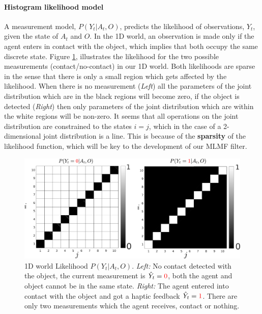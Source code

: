 \paragraph{Histogram likelihood model}

A measurement model, $P(Y_t|A_t,O)$, predicts the likelihood of observations, $Y_t$, given the state of $A_t$ and $O$. 
In the 1D world, an observation is made only if the agent enters in contact with the object, which implies that both
occupy the same discrete state. Figure \ref{fig:histogram_likelihood}, illustrates the likelihood for the two possible 
measurements (contact/no-contact) in our 1D world. Both likelihoods are sparse in the sense that there is only a small 
region which gets affected by the likelihood. When there is no measurement (\textit{Left}) all the parameters of the 
joint distribution which are in the black regions will become zero, if the object is detected (\textit{Right}) then 
only parameters of the joint distribution which are within the white regions will be non-zero. It seems that all 
operations on the joint distribution are constrained to the states $i = j$, which in the case of a 2-dimensional joint 
distribution is a line. This is because of the \textbf{sparsity} of the likelihood function, which will be key to 
the development of our MLMF filter.

\begin{figure}
 \centering
 \includegraphics[width=\textwidth]{./ch5-MLMF/Figures/explenation/hist_likelihood.pdf}
 \caption{1D world Likelihood $P(Y_t|A_t,O)$. \textit{Left:} No contact detected with the object, the current measurement 
 is $\hat{Y}_t = \textcolor{red}0$, both the agent and object cannot be in the same state. \textit{Right:} The agent 
 entered into contact with the object and got a haptic feedback $\hat{Y}_t = \textcolor{red}1$. There are only two measurements 
 which the agent receives, contact or nothing.}
 \label{fig:histogram_likelihood}
\end{figure}

